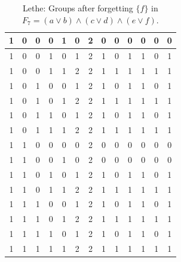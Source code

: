 \begin{table}[!tb]
\begin{tabular}{|c|c|c|c|c|c|c|c|c|c|c|c|c|}
        \rowcolor{red!40} 1 & 0 & 0 & 0 & 1 & 0 & 2 & 0 & 0 & 0 & 0 & 0 & 0 \\ \hline
        \rowcolor{green!40} 1 & 0 & 0 & 1 & 0 & 1 & 2 & 1 & 0 & 1 & 1 & 0 & 1 \\ \hline
        \rowcolor{yellow!40} 1 & 0 & 0 & 1 & 1 & 2 & 2 & 1 & 1 & 1 & 1 & 1 & 1 \\ \hline
        \rowcolor{gray!40} 1 & 0 & 1 & 0 & 0 & 1 & 2 & 1 & 0 & 1 & 1 & 0 & 1 \\ \hline
        \rowcolor{blue!40} 1 & 0 & 1 & 0 & 1 & 2 & 2 & 1 & 1 & 1 & 1 & 1 & 1 \\ \hline
        \rowcolor{red!40} 1 & 0 & 1 & 1 & 0 & 1 & 2 & 1 & 0 & 1 & 1 & 0 & 1 \\ \hline
        \rowcolor{green!40} 1 & 0 & 1 & 1 & 1 & 2 & 2 & 1 & 1 & 1 & 1 & 1 & 1 \\ \hline
        \rowcolor{yellow!40} 1 & 1 & 0 & 0 & 0 & 0 & 2 & 0 & 0 & 0 & 0 & 0 & 0 \\ \hline
        \rowcolor{gray!40} 1 & 1 & 0 & 0 & 1 & 0 & 2 & 0 & 0 & 0 & 0 & 0 & 0 \\ \hline
        \rowcolor{blue!40} 1 & 1 & 0 & 1 & 0 & 1 & 2 & 1 & 0 & 1 & 1 & 0 & 1 \\ \hline
        \rowcolor{red!40} 1 & 1 & 0 & 1 & 1 & 2 & 2 & 1 & 1 & 1 & 1 & 1 & 1 \\ \hline
        \rowcolor{green!40} 1 & 1 & 1 & 0 & 0 & 1 & 2 & 1 & 0 & 1 & 1 & 0 & 1 \\ \hline
        \rowcolor{yellow!40} 1 & 1 & 1 & 0 & 1 & 2 & 2 & 1 & 1 & 1 & 1 & 1 & 1 \\ \hline
        \rowcolor{gray!40} 1 & 1 & 1 & 1 & 0 & 1 & 2 & 1 & 0 & 1 & 1 & 0 & 1 \\ \hline
        \rowcolor{blue!40} 1 & 1 & 1 & 1 & 1 & 2 & 2 & 1 & 1 & 1 & 1 & 1 & 1 \\ \hline
    \end{tabular}
    \caption{Lethe: Groups after forgetting $\{f\}$ in $F_{7} = (a \lor b) \land (c \lor d) \land (e \lor f)$.}
    \label{tab:lethe-F7-f-groups}
\end{table}
